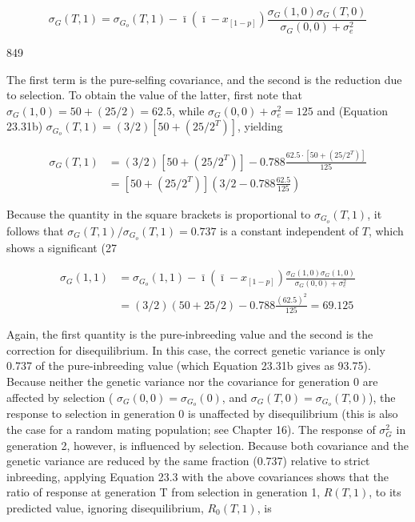 \documentclass{article}
\begin{document}
\begin{equation}
\sigma_{G}(T,1)=\sigma_{G_{o}}(T,1)-\bar{\imath}\left(\bar{\imath}-x_{[1-p]}\right)\frac{\sigma_{G}(1,0)\sigma_{G}(T,0)}{\sigma_{G}(0,0)+\sigma_{e}^{2}}
\end{equation}

849

The first term is the pure-selfing covariance, and the second is the reduction due to selection. To obtain the value of the latter, first note that  $ \sigma_G(1,0) = 50 + (25/2) = 62.5 $, while  $ \sigma_G(0,0) + \sigma_e^2 = 125 $ and (Equation 23.31b)  $ \sigma_{G_o}(T,1) = (3/2)\left[50 + (25/2^T)\right] $, yielding

\begin{equation}
\begin{aligned}\sigma_{G}(T,1)&=\left(3/2\right)\left[50+\left(25/2^{T}\right)\right]-0.788\frac{62.5\cdot\left[50+\left(25/2^{T}\right)\right]}{125}\\&=\left[50+\left(25/2^{T}\right)\right]\left(3/2-0.788\frac{62.5}{125}\right)\end{aligned}
\end{equation}

Because the quantity in the square brackets is proportional to  $ \sigma_{G_o}(T,1) $, it follows that  $ \sigma_G(T,1)/\sigma_{G_o}(T,1) = 0.737 $ is a constant independent of  $ T $, which shows a significant (27%

\begin{equation}
\begin{aligned}\sigma_{G}(1,1)&=\sigma_{G_{o}}(1,1)-\bar{\imath}(\bar{\imath}-x_{[1-p]})\frac{\sigma_{G}(1,0)\sigma_{G}(1,0)}{\sigma_{G}(0,0)+\sigma_{e}^{2}}\\&=(3/2)\left(50+25/2\right)-0.788\frac{(62.5)^{2}}{125}=69.125\end{aligned}
\end{equation}

Again, the first quantity is the pure-inbreeding value and the second is the correction for disequilibrium. In this case, the correct genetic variance is only 0.737 of the pure-inbreeding value (which Equation 23.31b gives as 93.75). Because neither the genetic variance nor the covariance for generation 0 are affected by selection ( $ \sigma_G(0,0) = \sigma_G_o(0) $, and  $ \sigma_G(T,0) = \sigma_G_o(T,0) $), the response to selection in generation 0 is unaffected by disequilibrium (this is also the case for a random mating population; see Chapter 16). The response of  $ \sigma_G^2 $ in generation 2, however, is influenced by selection. Because both covariance and the genetic variance are reduced by the same fraction (0.737) relative to strict inbreeding, applying Equation 23.3 with the above covariances shows that the ratio of response at generation T from selection in generation 1,  $ R(T,1) $, to its predicted value, ignoring disequilibrium,  $ R_0(T,1) $, is
\end{document}
